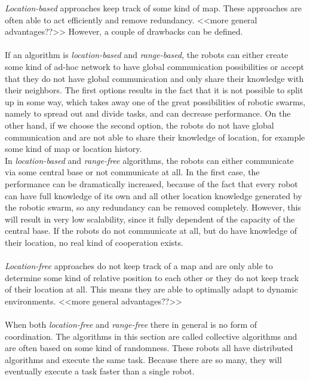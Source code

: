 \emph{Location-based} approaches keep track of some kind of map. These approaches are often able to act efficiently and remove redundancy. <<more general advantages??>>
However, a couple of drawbacks can be defined.\\
\\
If an algorithm is \emph{location-based} and \emph{range-based}, the robots can either create some kind of ad-hoc network to have global communication possibilities or accept that they do not have global communication and only share their knowledge with their neighbors.
The first options results in the fact that it is not possible to split up in some way, which takes away one of the great possibilities of robotic swarms, namely to spread out and divide tasks, and can decrease performance.
On the other hand, if we choose the second option, the robots do not have global communication and are not able to share their knowledge of location, for example some kind of map or location history.
\\
In \emph{location-based} and \emph{range-free} algorithms, the robots can either communicate via some central base or not communicate at all. 
In the first case, the performance can be dramatically increased, because of the fact that every robot can have full knowledge of its own and all other location knowledge generated by the robotic swarm, so any redundancy can be removed completely.
However, this will result in very low scalability, since it fully dependent of the capacity of the central base.
If the robots do not communicate at all, but do have knowledge of their location, no real kind of cooperation  exists.\\
\\
\emph{Location-free} approaches do not keep track of a map and are only able to determine some kind of relative position to each other or they do not keep track of their location at all. This means they are able to optimally adapt to dynamic environments. <<more general advantages??>>\\
\\
When both \emph{location-free} and \emph{range-free} there in general is no form of coordination. The algorithms in this section are called collective algorithms and are often based on some kind of randomness. These robots all have distributed algorithms and execute the same task. Because there are so many, they will eventually execute a task faster than a single robot.\\
